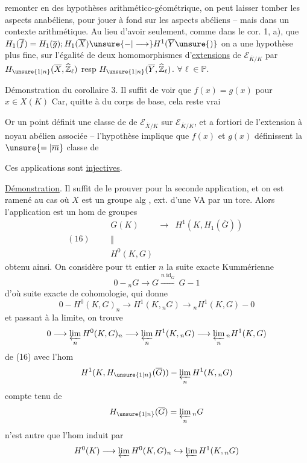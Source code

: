 remonter en des hypothèses   arithmético-géométrique, on peut laisser tomber les aspects anabéliens, pour jouer à fond sur les aspects abéliens -- mais dans un contexte arithmétique. Au lieu d'avoir  seulement, comme dans le cor. 1, a),  que $H_1(\overline f)=H_1(\overline g);H_1(\overline X)\unsure{-|\longrightarrow}H^1(\overline Y\unsure{)}$ on a une hypothèse plus fine, sur l'égalité de deux homomorphismes d'\uline{extensions} de $\mathcal E_{\overline K/K}$ par $H_{\unsure{1|n}}(\overline X,\widehat{\mathbb Z}_\ell)$ resp $H_{\unsure{1|n}}(\overline Y,\widehat{\mathbb Z}_\ell)$. $\forall\ell\in\mathbb P$.

Démonstration du corollaire 3.
Il suffit de voir que $f(x)=g(x)$ pour  $x\in X(K)$ Car, quitte à   du corps de base, cela reste vrai   

Or un point définit une classe de    de $\mathcal E_{\overline X/K}$ sur $\mathcal E_{\overline K/K}$, et a fortiori de l'extension à noyau abélien associée -- l'hypothèse implique que $f(x)$ et $g(x)$ définissent la $\unsure{=|\overline m}$ classe de

Ces applications sont \uline{injectives}.

\uline{Démonstration}. Il suffit de le prouver pour la seconde application, et on est ramené au cas où $X$ est  un groupe alg , ext. d'une VA par un tore. Alors l'application est un hom de groupes
\[
(16)\qquad
\begin{array}{ccl}
G(K)&\longrightarrow&H^1(K,H_1(\overline G))\\[-.5ex]
\Vert&&\\[-.5ex]
H^0(K,G)&&
\end{array}
\]
obtenu ainsi. On considère pour tt entier $n$ la suite exacte Kummérienne
\[
0-{}_nG\longrightarrow G\xrightarrow{n\operatorname{id}_G}G-1
\]
d'où suite exacte de cohomologie, qui donne
\[
0-H^0(K,G)_n\longrightarrow H^1(K,{}_nG)\longrightarrow {}_nH^1(K,G)-0
\]
et passant à la limite, on trouve
\[
0\longrightarrow\varprojlim_n H^0(K,G)_n\longrightarrow\varprojlim_n H^1(K,{}_nG)\longrightarrow\varprojlim_n {}_nH^1(K,G)
\]
  de (16) avec l'hom  
\[
H^1(K,H_{\unsure{1|n}}(\overline G))-\varprojlim_n H^1(K,{}_nG)
\]
compte tenu de
\[
H_{\unsure{1|n}}(\overline G)=\varprojlim_n {}_nG
\]
n'est autre que l'hom induit par
\[
H^0(K)\longrightarrow\varprojlim H^0(K,G)_n\hookrightarrow\varprojlim H^1(K,{}_nG)
\]

